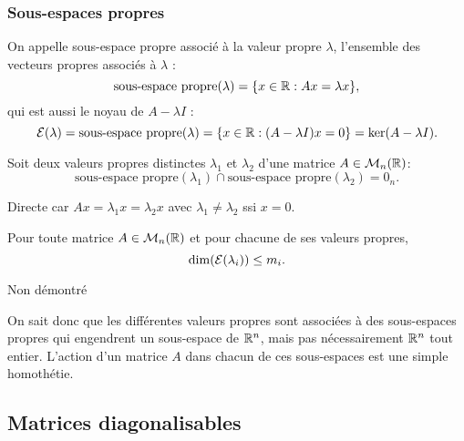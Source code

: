 \subsubsection{Sous-espaces propres} 

\begin{definition*}
  On appelle sous-espace propre associé à la valeur propre $\lambda$, l'ensemble des vecteurs propres associés à $\lambda$ :
  $$
  \text{sous-espace propre}(\lambda) = \{x \in \mathbb{R}: Ax = \lambda x\},
  $$
  qui est aussi le noyau de $A - \lambda I$ : 
  $$
  \mathcal{E}(\lambda) = \text{sous-espace propre}(\lambda) = \{x \in \mathbb{R}: (A - \lambda I)x = 0\} = \ker(A - \lambda I).
  $$
\end{definition*}

\begin{proposition*}
  Soit deux valeurs propres distinctes $\lambda_1$ et $\lambda_2$ d'une matrice $A \in \mathcal{M}_n(\mathbb{R})$:
  $$
  \text{sous-espace propre}(\lambda_1) \cap \text{sous-espace propre}(\lambda_2) = 0_n.
  $$
\end{proposition*}

\proof
Directe car $Ax = \lambda_1 x = \lambda_2 x$ avec $\lambda_1 \neq \lambda_2$ ssi $x = 0$.
\eproof


\begin{proposition*}
  Pour toute matrice $A \in \mathcal{M}_n(\mathbb{R})$ et pour chacune de ses valeurs propres, 
  $$
  \dim(\mathcal{E}(\lambda_i)) \leq m_i.
  $$
\end{proposition*}

\proof
Non démontré
\eproof

\remark
On sait donc que les différentes valeurs propres sont associées à des sous-espaces propres qui engendrent un sous-espace de $\mathbb{R}^n$, mais pas nécessairement $\mathbb{R}^n$ tout entier. L'action d'un matrice $A$ dans chacun de ces sous-espaces est une simple homothétie.

\subsection{Matrices diagonalisables} \label{sec:MatDiag}

